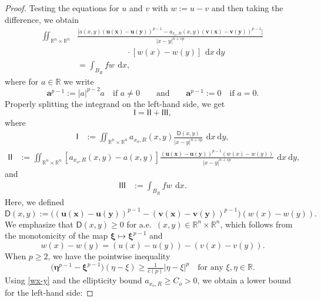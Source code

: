 \documentclass[10pt,letterpaper]{amsart}
\theoremstyle{definition}
\numberwithin{theorem}{section}
\numberwithin{equation}{section}
\newcommand{\R}{\ensuremath{\mathbb{R}}}
\newcommand{\1}{\ensuremath{\mathds{1}}}
\newcommand\sfI{{\boldsymbol{\mathsf I}}}
\newcommand\sfD{{\boldsymbol{\mathsf D}}}
\renewcommand{\d}{\:\! \mathrm{d}}
\numberwithin{equation}{section}
\begin{document}
\begin{proof}
Testing the equations for $u$ and $v$ with $w := u-v$ and then taking the difference, we obtain
\begin{align*}%
    \iint_{\R^n \times \R^n} &
    \frac{\big[a(x,y)\boldsymbol{(u(x) - u(y))}^{p-1} - a_{x_o,R}(x,y)\boldsymbol{(v(x) - v(y))}^{p-1}\big] }{|x-y|^{n+sp}}\\
    & \qquad\qquad\qquad\cdot[w(x) - w(y)]\, \d x \d y\\
    &= 
    \int_{B_R} f w \, \d x ,
\end{align*}
where for $a\in\R$ we write
$$
    \boldsymbol{a}^{p-1}
    :=
    |a|^{p-2} a
    \quad\mbox{if $a\not=0$}
    \qquad\mbox{and}\qquad 
    \boldsymbol{a}^{p-1}:=0
    \quad\mbox{if $a=0$}.
$$
Properly splitting the integrand on the left-hand side, we get
\begin{equation*}
    \sfI=\sfI\sfI+
    \sfI\sfI\sfI,
\end{equation*}
where
\begin{align*}
    \sfI&:=
    \iint_{\R^n \times \R^n}
    a_{x_o,R}(x,y)\frac{\sfD (x,y)}{|x-y|^{n+sp}} \, \d x \d y,
\end{align*}
\begin{align*}
    \sfI\sfI&:=\iint_{\R^n \times \R^n} [a_{x_o,R}(x,y)-a(x,y)]
    \frac{\boldsymbol{(u(x) - u(y))}^{p-1}  (w(x) - w(y))}{|x-y|^{n+sp}} \, \d x \d y,
\end{align*}
and
\begin{align*}
    \sfI\sfI\sfI
    &:=\int_{B_R} f w \, \d x.
\end{align*}
Here, we defined
\begin{equation*}
    \sfD (x,y)
    :=\big(\boldsymbol{(u(x)-u(y))}^{p-1}-
    \boldsymbol{(v(x)-v(y))}^{p-1}\big)
    (w(x)-w(y)).
\end{equation*}
We emphasize that $\sfD(x,y)\ge 0$ for a.e.~$(x,y)\in\R^n\times\R^n$,
which follows from the monotonicity of the map
$\boldsymbol\xi \mapsto\boldsymbol \xi^{p-1}$
and 
\begin{equation}
\label{wx-y}
    w(x) - w(y)
    =
    (u(x)-u(y)) - (v(x)-v(y)).
\end{equation} 
When $p\ge 2$, we have the pointwise inequality
\begin{equation*}
    \big(\boldsymbol{\eta}^{p-1}- \boldsymbol{\xi}^{p-1}\big)(\eta-\xi) \geq \tfrac{1}{c(p)} |\eta-\xi|^p
    \quad\mbox{for any $\xi,\eta\in \R$.}
\end{equation*}
Using \eqref{wx-y} and the ellipticity bound $a_{x_o,R} \ge C_o > 0$, we obtain a lower bound for the left-hand side:

\end{proof}
\end{document}
